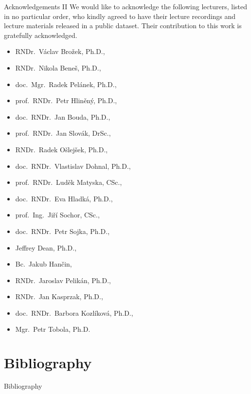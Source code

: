 \begin{frame}{Acknowledgements II}
We would like to acknowledge the following lecturers, listed in no particular
order, who kindly agreed to have their lecture recordings and lecture
materials released in a public dataset. Their contribution to this work is
gratefully acknowledged.

\scriptsize
\begin{multicols}{3}
\begin{itemize}
\item\alert{RNDr.\ Václav Brožek, Ph.D.},
\item\alert{RNDr.\ Nikola Beneš, Ph.D.},
\item\alert{doc.\ Mgr.\ Radek Pelánek, Ph.D.},
\item\alert{prof.\ RNDr.\ Petr Hliněný, Ph.D.},
\item\alert{doc.\ RNDr.\ Jan Bouda, Ph.D.},
\item\alert{prof.\ RNDr.\ Jan Slovák, DrSc.},
\item\alert{RNDr.\ Radek Ošlejšek, Ph.D.},
\item\alert{doc.\ RNDr.\ Vlastislav Dohnal, Ph.D.},
\item\alert{prof.\ RNDr.\ Luděk Matyska, CSc.},
\item\alert{doc.\ RNDr.\ Eva Hladká, Ph.D.},
\item\alert{prof.\ Ing.\ Jiří Sochor, CSc.},
\item\alert{doc.\ RNDr.\ Petr Sojka, Ph.D.},
\item\alert{Jeffrey Dean, Ph.D.},
\item\alert{Bc.\ Jakub Hančin},
\item\alert{RNDr.\ Jaroslav Pelikán, Ph.D.},
\item\alert{RNDr.\ Jan Kasprzak, Ph.D.},
\item\alert{doc.\ RNDr.\ Barbora Kozlíková, Ph.D.},
\item\alert{Mgr.\ Petr Tobola, Ph.D.}
\end{itemize}
\end{multicols}
\end{frame}

\section{Bibliography}

\begin{frame}[allowframebreaks]{Bibliography}
\printbibliography
\end{frame}

